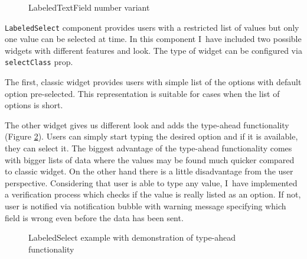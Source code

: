 \begin{figure}[h]
\caption{LabeledTextField number variant}
\label{labelledTextField}
\end{figure} 

\texttt{LabeledSelect} component provides users with a restricted list of values but only one value can be selected at time. In this component I~have included two possible widgets with different features and look. The type of widget can be configured via \texttt{selectClass} prop. 

The first, classic widget provides users with simple list of the options with default option pre-selected. This representation is suitable for cases when the list of options is short.

The other widget gives us different look and adds the type-ahead functionality (Figure \ref{labelledSelect}). Users can simply start typing the desired option and if it is available, they can select it. The biggest advantage of the type-ahead functionality comes with bigger lists of data where the values may be found much quicker compared to classic widget. On the other hand there is a little disadvantage from the user perspective. Considering that user is able to type any value, I~have implemented a verification process which checks if the value is really listed as an option. If not, user is notified via notification bubble with warning message specifying which field is wrong even before the data has been sent.

\begin{figure}[h]
\caption{LabeledSelect example with demonstration of type-ahead functionality}
\label{labelledSelect}
\end{figure} 

